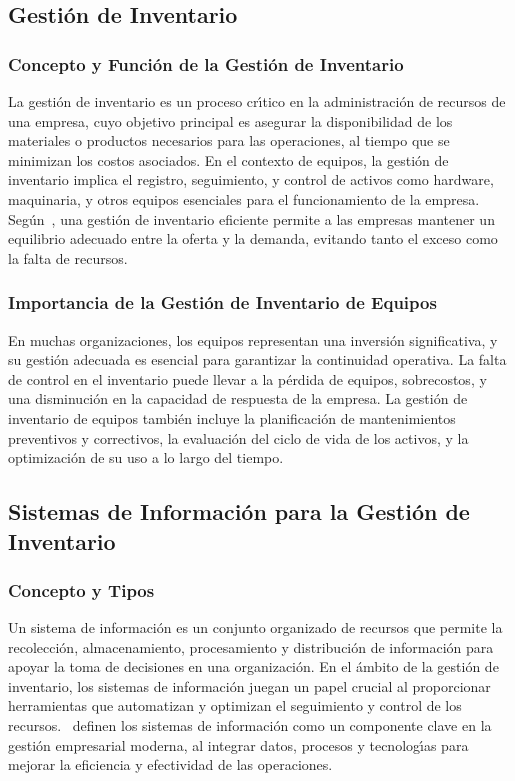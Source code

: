 \documentclass[stu, 12pt, letterpaper, donotrepeattitle, floatsintext, natbib]{apa7}
\begin{document}
\subsection{Gesti\'on de Inventario}
\subsubsection{Concepto y Funci\'on de la Gesti\'on de Inventario}
La gesti\'on de inventario es un proceso cr\'{\i}tico en la administraci\'on de recursos de una empresa, cuyo objetivo principal es asegurar la disponibilidad de los materiales o productos necesarios para las operaciones, al
tiempo que se minimizan los costos asociados. En el contexto de equipos, la gesti\'on de inventario implica el registro, seguimiento, y control de activos como hardware, maquinaria, y otros equipos esenciales para el funcionamiento
de la empresa. Seg\'un~\cite{cja}, una gesti\'on de inventario eficiente permite a las empresas mantener un equilibrio adecuado entre la oferta y la demanda, evitando tanto el exceso como la falta de recursos.
\subsubsection{Importancia de la Gesti\'on de Inventario de Equipos}
En muchas organizaciones, los equipos representan una inversi\'on significativa, y su gesti\'on adecuada es esencial para garantizar la continuidad operativa. La falta de control en el inventario puede llevar a la p\'erdida de
equipos, sobrecostos, y una disminuci\'on en la capacidad de respuesta de la empresa. La gesti\'on de inventario de equipos tambi\'en incluye la planificaci\'on de mantenimientos preventivos y correctivos, la evaluaci\'on del
ciclo de vida de los activos, y la optimizaci\'on de su uso a lo largo del tiempo.
\subsection{Sistemas de Informaci\'on para la Gesti\'on de Inventario}
\subsubsection{Concepto y Tipos}
Un sistema de informaci\'on es un conjunto organizado de recursos que permite la recolecci\'on, almacenamiento, procesamiento y distribuci\'on de informaci\'on para apoyar la toma de decisiones en una organizaci\'on. En el \'ambito
de la gesti\'on de inventario, los sistemas de informaci\'on juegan un papel crucial al proporcionar herramientas que automatizan y optimizan el seguimiento y control de los recursos.~\cite{om} definen los sistemas de informaci\'on
como un componente clave en la gesti\'on empresarial moderna, al integrar datos, procesos y tecnolog\'{\i}as para mejorar la eficiencia y efectividad de las operaciones.
\end{document}
